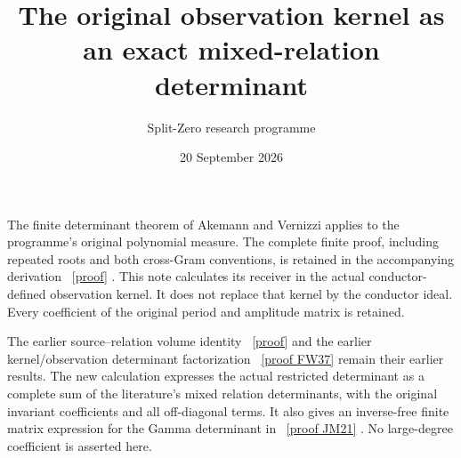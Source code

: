 \documentclass[11pt]{article}
\title{The original observation kernel as an exact mixed-relation determinant}
\author{Split-Zero research programme}
\date{20 September 2026}
\begin{document}
\maketitle

The finite determinant theorem of Akemann and Vernizzi
\cite[\texttt{Th}, \texttt{Ddef}, \texttt{deg}]{AV} applies to the
programme's original polynomial measure. The complete finite proof,
including repeated roots and both cross-Gram conventions, is retained
in the accompanying derivation \cite{Mixed}%
~\href{https://github.com/KokunoYumeto/zeta-function-research-reader/blob/5992ad50c0f2a06921f1fcaded7b4e38097c0739/workbenches/splitzero-tandem/continuations/20260920-original-kernel-mixed-determinants/MIXED_CONFLUENT_PROOF.tex\#L1}{[proof]}%
{}. This note calculates its
receiver in the actual conductor-defined observation kernel. It does
not replace that kernel by the conductor ideal. Every coefficient of
the original period and amplitude matrix is retained.

The earlier source--relation volume identity \cite[(11)--(16)]{Toda}%
~\href{https://github.com/KokunoYumeto/zeta-function-research-reader/blob/5992ad50c0f2a06921f1fcaded7b4e38097c0739/workbenches/splitzero-tandem/continuations/20260920-original-kernel-mixed-determinants/providers/TODA_VOLUME_CONTROL.tex\#L1}{[proof]}%
{}
and the earlier kernel/observation determinant factorization
\cite[FW37--40]{FW}%
~\href{https://github.com/KokunoYumeto/zeta-function-research-reader/blob/5992ad50c0f2a06921f1fcaded7b4e38097c0739/workbenches/splitzero-tandem/continuations/20260920-original-kernel-mixed-determinants/providers/FULL_WINDOW_SOURCE_PRODUCTS.tex\#L577}{[proof FW37]}%
{} remain their earlier results. The new calculation
expresses the actual restricted determinant as a complete sum of the
literature's mixed relation determinants, with the original invariant
coefficients and all off-diagonal terms. It also gives an inverse-free
finite matrix expression for the Gamma determinant in
\cite[JM21--28]{JM}%
~\href{https://github.com/KokunoYumeto/zeta-function-research-reader/blob/5992ad50c0f2a06921f1fcaded7b4e38097c0739/workbenches/splitzero-tandem/continuations/20260920-original-kernel-mixed-determinants/providers/JOINT_MINIMUM_RECEIVERS.tex\#L286}{[proof JM21]}%
{}. No large-degree coefficient is asserted here.
\end{document}
